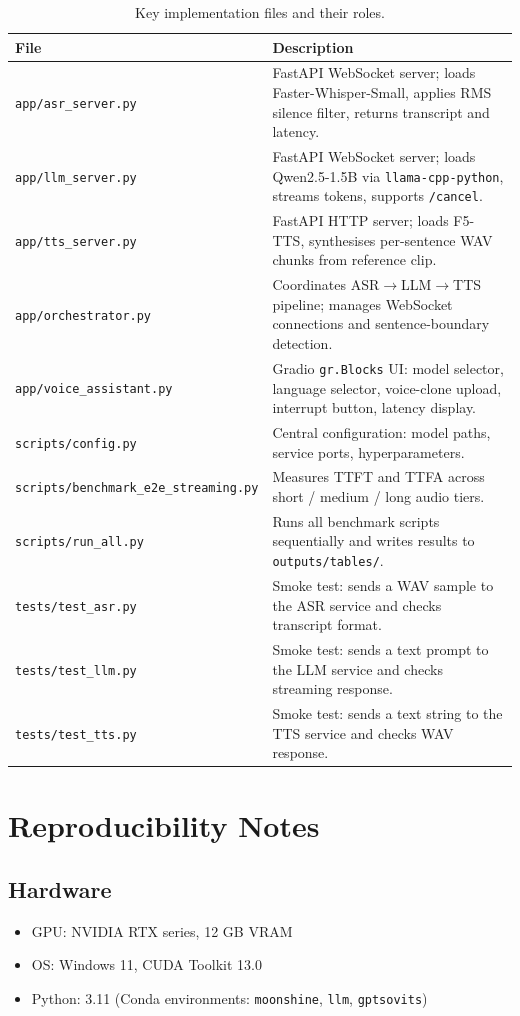 \documentclass[12pt, a4paper]{article}
\begin{document}
\begin{table}[H]
\centering
\caption{Key implementation files and their roles.}
\label{tab:impl_files}
\begin{tabular}{lp{9cm}}
\toprule
File & Description \\
\midrule
\texttt{app/asr\_server.py}      & FastAPI WebSocket server; loads Faster-Whisper-Small, applies RMS silence filter, returns transcript and latency. \\
\texttt{app/llm\_server.py}      & FastAPI WebSocket server; loads Qwen2.5-1.5B via \texttt{llama-cpp-python}, streams tokens, supports \texttt{/cancel}. \\
\texttt{app/tts\_server.py}      & FastAPI HTTP server; loads F5-TTS, synthesises per-sentence WAV chunks from reference clip. \\
\texttt{app/orchestrator.py}     & Coordinates ASR$\to$LLM$\to$TTS pipeline; manages WebSocket connections and sentence-boundary detection. \\
\texttt{app/voice\_assistant.py} & Gradio \texttt{gr.Blocks} UI: model selector, language selector, voice-clone upload, interrupt button, latency display. \\
\texttt{scripts/config.py}       & Central configuration: model paths, service ports, hyperparameters. \\
\texttt{scripts/benchmark\_e2e\_streaming.py} & Measures TTFT and TTFA across short / medium / long audio tiers. \\
\texttt{scripts/run\_all.py}     & Runs all benchmark scripts sequentially and writes results to \texttt{outputs/tables/}. \\
\texttt{tests/test\_asr.py}      & Smoke test: sends a WAV sample to the ASR service and checks transcript format. \\
\texttt{tests/test\_llm.py}      & Smoke test: sends a text prompt to the LLM service and checks streaming response. \\
\texttt{tests/test\_tts.py}      & Smoke test: sends a text string to the TTS service and checks WAV response. \\
\bottomrule
\end{tabular}
\end{table}

\section{Reproducibility Notes}

\subsection*{Hardware}
\begin{itemize}
  \item GPU: NVIDIA RTX series, 12 GB VRAM
  \item OS: Windows 11, CUDA Toolkit 13.0
  \item Python: 3.11 (Conda environments: \texttt{moonshine}, \texttt{llm}, \texttt{gptsovits})
\end{itemize}
\end{document}
